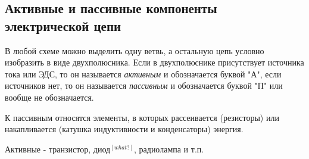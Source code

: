 \subsection{Активные и пассивные компоненты электрической цепи}

В любой схеме можно выделить одну ветвь, а остальную цепь условно изобразить в виде двухполюсника. Если в двухполюснике присутствует источника тока или ЭДС, то он называется \textit{активным} и обозначается буквой "А", если источников нет, то он называется \textit{пассивным} и обозначается буквой "П" или вообще не обозначается.

 К пассивным относятся элементы, в которых рассеивается (резисторы) или накапливается (катушка индуктивности и конденсаторы) энергия. 
 
Активные  - транзистор, диод$^{[what?]}$, радиолампа и т.п.


\pagebreak